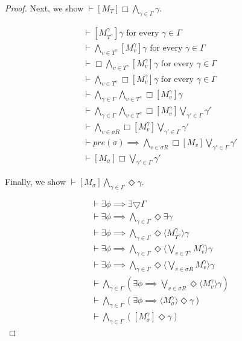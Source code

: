 \documentclass[12pt, a4paper, titlepage]{scrartcl}
\numberwithin{equation}{section}
\newcommand{\cover}{\bigtriangledown}
\begin{document}
\begin{proof}
Next, we show $\vdash [M_T] \Box \bigwedge_{\gamma \in \Gamma} \gamma$.

\begin{align}
	& \vdash [ M^{\gamma}_{T^{\gamma}} ] \gamma \text{ for every }\gamma \in \Gamma\\
	& \vdash \bigwedge_{v \in T^\gamma} [M^\gamma_v] \gamma \text{ for every }\gamma \in \Gamma\\
	& \vdash \Box \bigwedge_{v \in T^\gamma} [M^\gamma_v] \gamma \text{ for every } \gamma \in \Gamma\\
	& \vdash \bigwedge_{v \in T^\gamma} \Box [M^\gamma_v] \gamma \text{ for every } \gamma \in \Gamma\\
	& \vdash \bigwedge_{\gamma \in \Gamma} \bigwedge_{v \in T^\gamma} \Box [M^\gamma_v] \gamma\\
	& \vdash \bigwedge_{\gamma \in \Gamma} \bigwedge_{v \in T^\gamma} \Box [M^\gamma_v]
	\bigvee_{\gamma' \in \Gamma} \gamma'\\
	& \vdash \bigwedge_{v \in \sigma R} \Box [M^\gamma_v]\bigvee_{\gamma' \in \Gamma} \gamma'\\
	& \vdash pre(\sigma) \implies \bigwedge_{v \in \sigma R} \Box [M_v] \bigvee_{\gamma' \in \Gamma} \gamma'\\
	& \vdash [M_\sigma] \Box \bigvee_{\gamma' \in \Gamma} \gamma'
\end{align}

Finally, we show $\vdash [M_\sigma]\bigwedge_{\gamma \in \Gamma} \Diamond \gamma$.

\begin{align}
	& \vdash \exists \phi \implies \exists \cover \Gamma\\
	& \vdash \exists \phi \implies \bigwedge_{\gamma \in \Gamma} \Diamond \exists \gamma\\
	& \vdash \exists \phi \implies \bigwedge_{\gamma \in \Gamma} \Diamond \langle
	M^\gamma_{T^{\gamma}} \rangle \gamma\\
	& \vdash \exists \phi \implies \bigwedge_{\gamma \in \Gamma} \Diamond \langle
	\bigvee_{v \in T^\gamma} M^\gamma_{v} \rangle \gamma\\
	& \vdash \exists \phi \implies \bigwedge_{\gamma \in \Gamma} \Diamond \langle
	\bigvee_{v \in \sigma R} M^\gamma_{v} \rangle \gamma\\
	& \vdash \bigwedge_{\gamma \in \Gamma} (\exists \phi \implies \bigvee_{v \in \sigma R}
	\Diamond \langle M^\gamma_{v} \rangle \gamma)\\
	& \vdash \bigwedge_{\gamma \in \Gamma} (\exists \phi \implies \langle M^\gamma_{\sigma}
	\rangle \Diamond \gamma)\\
	& \vdash \bigwedge_{\gamma \in \Gamma} ([M^\gamma_{\sigma}] \Diamond \gamma)
\end{align}


\end{proof}
\end{document}
